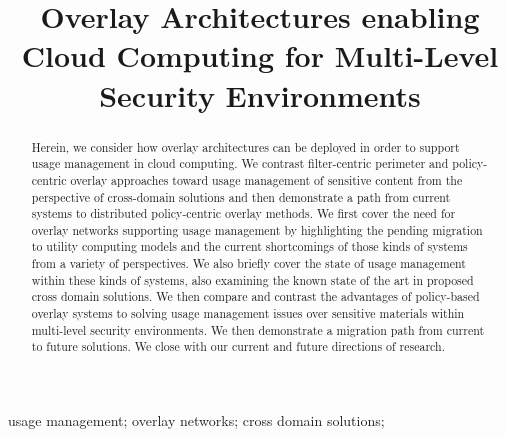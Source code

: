 \documentclass[10pt, conference, compsocconf]{IEEEtran}
\begin{document}
\title{Overlay Architectures enabling Cloud Computing for Multi-Level Security Environments}

\author{
\and
{}
}

\maketitle

\begin{abstract}
Herein,  we consider how overlay architectures can be deployed in order to support usage management in cloud computing.  We contrast filter-centric perimeter and policy-centric overlay approaches toward usage management of sensitive content from the perspective of cross-domain solutions and then demonstrate a path from current systems to distributed policy-centric overlay methods.  We first cover the need for overlay networks supporting usage management by highlighting the pending migration to utility computing models and the current shortcomings of those kinds of systems from a variety of perspectives.  We also briefly cover the state of usage management within these kinds of systems, also examining the known state of the art in proposed cross domain solutions.  We then compare and contrast the advantages of policy-based overlay systems to solving usage management issues over sensitive materials within multi-level security environments. We then demonstrate a migration path from current to future solutions.  We close with our current and future directions of research. 
\end{abstract}

\begin{IEEEkeywords}
usage management; overlay networks; cross domain solutions;

\end{IEEEkeywords}

\IEEEpeerreviewmaketitle




\end{document}
